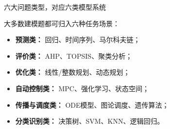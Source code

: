 \begin{frame}{\color{techwhite}六大问题类型，对应六类模型系统}
\justifying
{\color{techwhite}
大多数建模题都可归入六种任务场景：

\vspace{0.5em}
\begin{itemize}
  \item \textbf{预测类：} 回归、时间序列、马尔科夫链；
  \item \textbf{评价类：} AHP、TOPSIS、聚类分析；
  \item \textbf{优化类：} 线性/整数规划、动态规划；
  \item \textbf{自动控制类：} MPC、强化学习、状态空间；
  \item \textbf{传播与调度类：} ODE模型、图论调度、遗传算法；
  \item \textbf{分类识别类：} 决策树、SVM、KNN、逻辑回归。
\end{itemize}
}
\end{frame}
